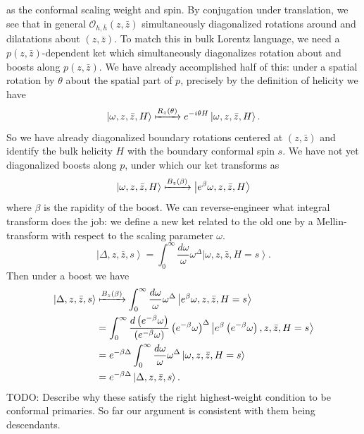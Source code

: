 \documentclass[11pt,letterpaper]{article}
\newcommand{\LP}{\left(}
\newcommand{\RP}{\right)}
\newcommand{\mc}[1]{\mathcal{#1}}
\newcommand{\KET}[1]{\left| #1 \right\rangle }
\begin{document}
as the conformal scaling weight and spin. By conjugation under translation, we see that in general $\mc{O}_{h, \bar{h}}(z, \bar{z})$ simultaneously diagonalized rotations around and dilatations about $(z, \bar{z})$. To match this in bulk Lorentz language, we need a $p(z, \bar{z})$-dependent ket which simultaneously diagonalizes rotation about and boosts along $p(z, \bar{z})$. We have already accomplished half of this: under a spatial rotation by $\theta$ about the spatial part of $p$, precisely by the definition of helicity we have \begin{equation}
\KET{\omega, z, \bar{z}, H} \xmapsto{R_z(\theta)} e^{- i \theta H} \KET{\omega, z, \bar{z}, H}.
\end{equation}
So we have already diagonalized boundary rotations centered at $(z, \bar{z})$ and identify the bulk helicity $H$ with the boundary conformal spin $s$. We have not yet diagonalized boosts along $p$, under which our ket transforms as \begin{equation}
\KET{\omega, z, \bar{z}, H}  \xmapsto{B_z(\beta)} \KET{e^{\beta} \omega, z, \bar{z}, H}
\end{equation}
where $\beta$ is the rapidity of the boost. We can reverse-engineer what integral transform does the job: we define a new ket related to the old one by a Mellin-transform with respect to the scaling parameter $\omega$. \begin{equation}
\KET{\Delta, z, \bar{z}, s} = \int_0^\infty \frac{d \omega}{\omega} \omega^{\Delta} \KET{\omega, z, \bar{z}, H = s}.
\end{equation}
Then under a boost we have \begin{equation}
\begin{aligned}
\KET{\Delta, z, \bar{z}, s} & \xmapsto{B_z(\beta)} \int_0^\infty \frac{d \omega}{\omega} \omega^{\Delta} \KET{e^{\beta} \omega, z, \bar{z}, H = s} \\
& = \int_0^\infty \frac{d  \LP e^{-\beta} \omega \RP}{\LP e^{ -\beta} \omega \RP} \LP e^{- \beta} \omega \RP^{\Delta} \KET{e^{\beta} \LP e^{ -\beta} \omega \RP, z, \bar{z}, H = s} \\
& = e^{-\beta \Delta} \int_0^\infty \frac{d \omega}{\omega} \omega^{\Delta} \KET{\omega, z, \bar{z}, H = s}  \\
& = e^{-\beta \Delta} \KET{\Delta, z, \bar{z}, s}.
\end{aligned}
\end{equation}
TODO: Describe why these satisfy the right highest-weight condition to be conformal primaries. So far our argument is consistent with them being descendants.\\
\end{document}
